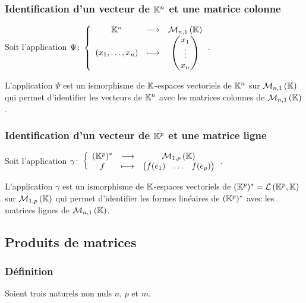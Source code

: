 \subsubsection{Identification d'un vecteur de \(\mathbb{K}^n\) et une matrice colonne}

Soit l'application
\(\Psi\colon\left\{\begin{array}{ccc}\mathbb{K}^n & \longrightarrow &\mathcal{M}_{n,1}\left(\mathbb{K}\right)\\(x_1,\ldots,x_n) & \longmapsto & \begin{pmatrix}x_1 \\
\vdots \\ x_n \end{pmatrix}\end{array}\right.\).

\begin{theo}
  L'application \(\Psi\) est un ismorphisme de \(\mathbb{K}\)-espaces vectoriels de
  \(\mathbb{K}^n\) sur \(\mathcal{M}_{n,1}\left(\mathbb{K}\right)\) qui permet d'identifier les vecteurs de
  \(\mathbb{K}^n\) avec les matrices colonnes de \(\mathcal{M}_{n,1}\left(\mathbb{K}\right)\).
\end{theo}

\subsubsection{Identification d'un vecteur de \(\mathbb{K}^p\) et une matrice ligne}

Soit l'application
\(\gamma\colon\left\{\begin{array}{ccc}(\mathbb{K}^p)^{*} & \longrightarrow &\mathcal{M}_{1,p}\left(\mathbb{K}\right)\\f & \longmapsto & \begin{pmatrix}f(e_1) &
\ldots & f(e_p) \end{pmatrix}\end{array}\right.\).

\begin{theo}
  L'application \(\gamma\) est un ismorphisme de \(\mathbb{K}\)-espaces vectoriels de
  \((\mathbb{K}^p)^{*}=\mathcal{L}\left(\mathbb{K}^p,\mathbb{K}\right)\) sur \(\mathcal{M}_{1,p}\left(\mathbb{K}\right)\) qui permet d'identifier
  les formes linéaires de \((\mathbb{K}^p)^{*}\) avec les matrices lignes de
  \(\mathcal{M}_{n,1}\left(\mathbb{K}\right)\).
\end{theo}

\subsection{Produits de matrices}

\subsubsection{Définition}

Soient trois naturels non nuls \(n\), \(p\) et \(m\).

